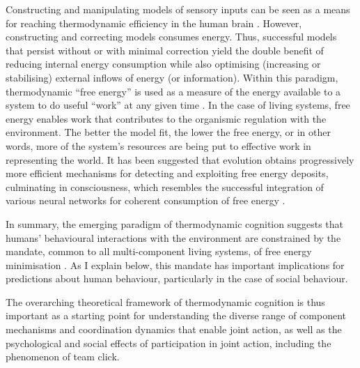 \begin{CJK}{UTF8}{gbsn}
Constructing and manipulating models of sensory inputs can be seen as a means for reaching thermodynamic efficiency in the human brain \citep{Yufik2013}. However, constructing and correcting models consumes energy.  Thus, successful models that persist without or with minimal correction yield the double benefit of reducing internal energy consumption while also optimising (increasing or stabilising) external inflows of energy (or information).  Within this paradigm, thermodynamic ``free energy'' is used as a measure of the energy available to a system to do useful ``work'' at any given time \citep[and entropy is the long-term average of free energy, see][]{Stoner2000,Friston2013}.  In the case of living systems, free energy enables work that contributes to the organismic regulation with the environment. The better the model fit, the lower the free energy, or in other words, more of the system's resources are being put to effective work in representing the world.  It has been suggested that evolution obtains progressively more efficient mechanisms for detecting and exploiting free energy deposits, culminating in consciousness, which resembles the successful integration of various neural networks for coherent consumption of free energy \citep{Annila2016}.

In summary, the emerging paradigm of thermodynamic cognition suggests that humans' behavioural interactions with the environment are constrained by the mandate, common to all multi-component living systems, of free energy minimisation \citep{Friston2013}.  As I explain below, this mandate has important implications for predictions about human behaviour, particularly in the case of social behaviour.

The overarching theoretical framework of thermodynamic cognition is thus important as a starting point for understanding the diverse range of component mechanisms and coordination dynamics that enable joint action, as well as the psychological and social effects of participation in joint action, including the phenomenon of team click.



\end{CJK}
